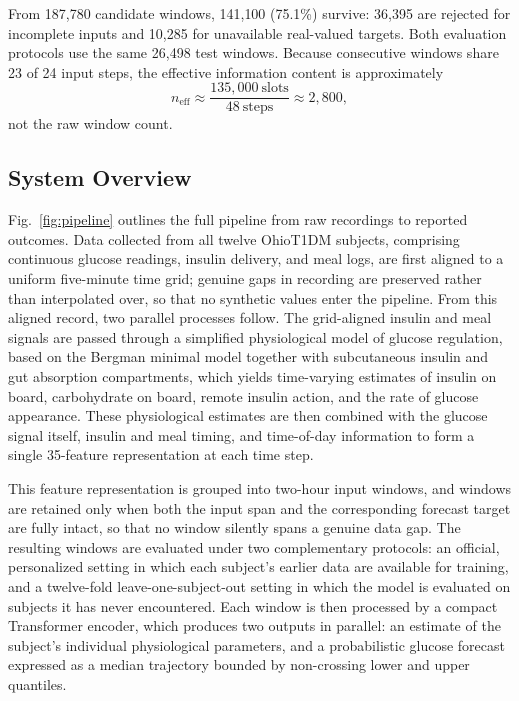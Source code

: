\documentclass[journal]{IEEEtran}
\begin{document}
From 187,780 candidate windows, 141,100 (75.1\%) survive: 36,395 are rejected for incomplete inputs and 10,285 for unavailable real-valued targets. Both evaluation protocols use the same 26,498 test windows. Because consecutive windows share 23 of 24 input steps, the effective information content is approximately
\begin{equation}
n_{\text{eff}} \approx \frac{135{,}000\ \text{slots}}{48\ \text{steps}} \approx 2{,}800,
\label{eq:neff}
\end{equation}
not the raw window count.

\subsection{System Overview}

Fig.~\ref{fig:pipeline} outlines the full pipeline from raw recordings to reported outcomes. Data collected from all twelve OhioT1DM subjects, comprising continuous glucose readings, insulin delivery, and meal logs, are first aligned to a uniform five-minute time grid; genuine gaps in recording are preserved rather than interpolated over, so that no synthetic values enter the pipeline. From this aligned record, two parallel processes follow. The grid-aligned insulin and meal signals are passed through a simplified physiological model of glucose regulation, based on the Bergman minimal model together with subcutaneous insulin and gut absorption compartments, which yields time-varying estimates of insulin on board, carbohydrate on board, remote insulin action, and the rate of glucose appearance. These physiological estimates are then combined with the glucose signal itself, insulin and meal timing, and time-of-day information to form a single 35-feature representation at each time step.

This feature representation is grouped into two-hour input windows, and windows are retained only when both the input span and the corresponding forecast target are fully intact, so that no window silently spans a genuine data gap. The resulting windows are evaluated under two complementary protocols: an official, personalized setting in which each subject's earlier data are available for training, and a twelve-fold leave-one-subject-out setting in which the model is evaluated on subjects it has never encountered. Each window is then processed by a compact Transformer encoder, which produces two outputs in parallel: an estimate of the subject's individual physiological parameters, and a probabilistic glucose forecast expressed as a median trajectory bounded by non-crossing lower and upper quantiles.
\end{document}
